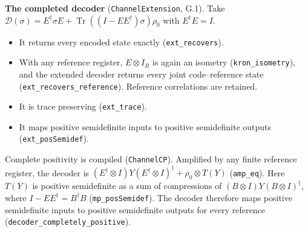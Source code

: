 \documentclass[
]{article}
\providecommand{\tightlist}{%
  \setlength{\itemsep}{0pt}\setlength{\parskip}{0pt}}
\begin{document}
\textbf{The completed decoder} (\texttt{ChannelExtension}, G.1). Take
\(\mathcal D(\sigma)=E^\dagger\sigma E+\operatorname{Tr}((I-EE^\dagger)\sigma)\rho_0\)
with \(E^\dagger E=I\).

\begin{itemize}
\tightlist
\item
  It returns every encoded state exactly (\texttt{ext\_recovers}).
\item
  With any reference register, \(E\otimes I_R\) is again an isometry
  (\texttt{kron\_isometry}), and the extended decoder returns every
  joint code--reference state
  (\texttt{e\allowbreak{}x\allowbreak{}t\allowbreak{}\_\allowbreak{}r\allowbreak{}e\allowbreak{}c\allowbreak{}o\allowbreak{}v\allowbreak{}e\allowbreak{}r\allowbreak{}s\allowbreak{}\_\allowbreak{}r\allowbreak{}e\allowbreak{}f\allowbreak{}e\allowbreak{}r\allowbreak{}e\allowbreak{}n\allowbreak{}c\allowbreak{}e}).
  Reference correlations are retained.
\item
  It is trace preserving (\texttt{ext\_trace}).
\item
  It maps positive semidefinite inputs to positive semidefinite outputs
  (\texttt{ext\_posSemidef}).
\end{itemize}

Complete positivity is compiled (\texttt{ChannelCP}). Amplified by any
finite reference register, the decoder is
\((E^\dagger\otimes I)Y(E^\dagger\otimes I)^\dagger+\rho_0\otimes T(Y)\)
(\texttt{amp\_eq}). Here \(T(Y)\) is positive semidefinite as a sum of
compressions of \((B\otimes I)Y(B\otimes I)^\dagger\), where
\(I-EE^\dagger=B^\dagger B\) (\texttt{mp\_posSemidef}). The decoder
therefore maps positive semidefinite inputs to positive semidefinite
outputs for every reference
(\texttt{d\allowbreak{}e\allowbreak{}c\allowbreak{}o\allowbreak{}d\allowbreak{}e\allowbreak{}r\allowbreak{}\_\allowbreak{}c\allowbreak{}o\allowbreak{}m\allowbreak{}p\allowbreak{}l\allowbreak{}e\allowbreak{}t\allowbreak{}e\allowbreak{}l\allowbreak{}y\allowbreak{}\_\allowbreak{}p\allowbreak{}o\allowbreak{}s\allowbreak{}i\allowbreak{}t\allowbreak{}i\allowbreak{}v\allowbreak{}e}).
\end{document}
